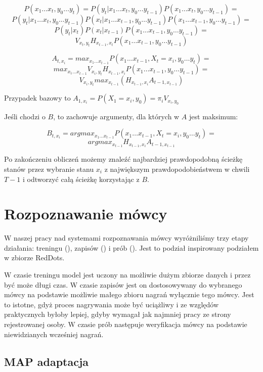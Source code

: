 $$P(x_1 \dots x_t, y_0 \dots y_t) = P(y_t | x_1 \dots x_t, y_0 \dots y_{t-1}) P(x_1 \dots x_t, y_0 \dots y_{t-1}) =$$
$$P(y_t | x_1 \dots x_t, y_0 \dots y_{t-1}) P(x_t | x_1 \dots x_{t-1}, y_0 \dots y_{t-1}) P(x_1 \dots x_{t-1}, y_0 \dots y_{t-1}) =$$
$$P(y_t | x_t) P(x_t | x_{t-1}) P(x_1 \dots x_{t-1}, y_0 \dots y_{t-1}) =$$
$$V_{x_t, y_t} H_{x_{t-1}, x_t} P(x_1 \dots x_{t-1}, y_0 \dots y_{t-1})$$

$$A_{t,x_i} = max_{x_1 \dots x_{t-1}} P(x_1 \dots x_{t-1}, X_t = x_i, y_0 \dots y_t) =$$
$$max_{x_1 \dots x_{t-1}} V_{x_i, y_t} H_{x_{t-1}, x_i} P(x_1 \dots x_{t-1}, y_0 \dots y_{t-1}) =$$
$$V_{x_i, y_t} max_{x_{t-1}}(H_{x_{t-1}, x_i} A_{t-1, x_{t-1}})$$

Przypadek bazowy to $A_{1,x_i} = P(X_1 = x_i, y_0) = \pi_i V_{x_i, y_0}$

Jeśli chodzi o $B$, to zachowuje argumenty, dla których w $A$ jest maksimum:

$$B_{t, x_i} = argmax_{x_1 \dots x_{t-1}} P(x_1 \dots x_{t-1}, X_t = x_i, y_0 \dots y_t) =$$
$$argmax_{x_{t-1}} H_{x_{t-1}, x_i} A_{t-1, x_{t-1}}$$

Po zakończeniu obliczeń możemy znaleźć najbardziej prawdopodobną ścieżkę stanów przez wybranie stanu $x_i$ z największym prawdopodobieństwem w chwili $T-1$ i odtworzyć całą ścieżkę korzystając z $B$\cite{aTutorialOnHidden}.

\section{Rozpoznawanie mówcy}\label{sec:rozpoznawanie_mowcy}

W naszej pracy nad systemami rozpoznawania mówcy wyróżniliśmy trzy etapy działania: treningu (),
zapisów () i prób (). Jest to podział inspirowany podziałem w zbiorze RedDots.

W czasie treningu model jest uczony na możliwie dużym zbiorze danych i przez być może długi czas. W czasie zapisów
jest on dostosowywany do wybranego mówcy na podstawie możliwie małego zbioru nagrań wyłącznie tego mówcy. Jest
to istotne, gdyż proces nagrywania może być uciążliwy i ze względów praktycznych byłoby lepiej, gdyby wymagał
jak najmniej pracy ze strony rejestrowanej osoby. W czasie prób następuje weryfikacja mówcy na podstawie niewidzianych
wcześniej nagrań.

\subsection{MAP adaptacja}

